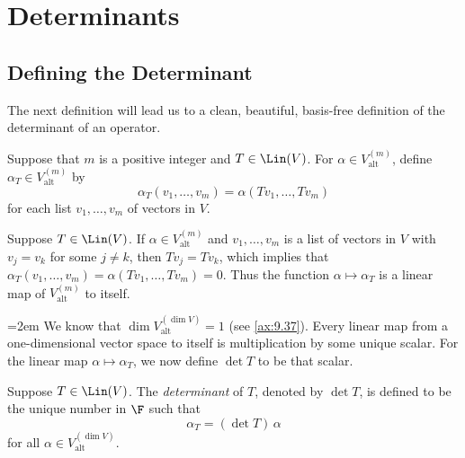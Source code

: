 \section{Determinants}

\subsection{Defining the Determinant}

The next definition will lead us to a clean, beautiful, basis-free definition
of the determinant of an operator.

\begin{definition}[$\alpha_T$]\label{ax:9.40}
Suppose that $m$ is a positive integer and $T\in\Lin(V)$. For
$\alpha\in V_{\mathrm{alt}}^{(m)}$, define $\alpha_T\in V_{\mathrm{alt}}^{(m)}$
by
\[ \alpha_T(v_1,\dots,v_m) = \alpha(Tv_1,\dots,Tv_m) \]
for each list $v_1,\dots,v_m$ of vectors in $V$.
\end{definition}

Suppose $T\in\Lin(V)$. If $\alpha\in V_{\mathrm{alt}}^{(m)}$ and
$v_1,\dots,v_m$ is a list of vectors in $V$ with $v_j=v_k$ for some $j\ne k$,
then $Tv_j=Tv_k$, which implies that
$\alpha_T(v_1,\dots,v_m)=\alpha(Tv_1,\dots,Tv_m)=0$. Thus the function
$\alpha\mapsto\alpha_T$ is a linear map of $V_{\mathrm{alt}}^{(m)}$ to itself.

\begingroup\emergencystretch=2em
We know that $\dim V_{\mathrm{alt}}^{(\dim V)}=1$ (see \ref{ax:9.37}). Every
linear map from a one-dimensional vector space to itself is multiplication by
some unique scalar. For the linear map $\alpha\mapsto\alpha_T$, we now define
$\det T$ to be that scalar.\par\endgroup

\begin{definition}\label{ax:9.41}
Suppose $T\in\Lin(V)$. The \emph{determinant} of $T$, denoted by $\det T$, is
defined to be the unique number in $\F$ such that
\[ \alpha_T = (\det T)\,\alpha \]
for all $\alpha\in V_{\mathrm{alt}}^{(\dim V)}$.
\end{definition}

